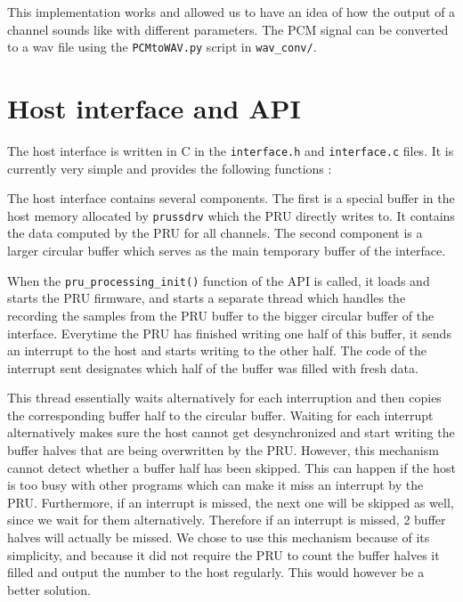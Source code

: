 \documentclass[]{report}
\begin{document}
This implementation works and allowed us to have an idea of how the output of a channel sounds like with different parameters. The PCM signal can be converted to a wav file using the \texttt{PCMtoWAV.py} script in \texttt{wav\_conv/}.

\hypertarget{host-interface-and-api}{%
\section{Host interface and API}\label{host-interface-and-api}}

The host interface is written in C in the \texttt{interface.h} and
\texttt{interface.c} files. It is currently very simple and provides the
following functions :




The host interface contains several components. The first is a special buffer in the host memory allocated by \texttt{prussdrv} which the PRU directly writes to. It contains the data computed by the PRU for all channels. The second component is a larger circular buffer which serves as the main temporary buffer of the interface.

When the \texttt{pru\_processing\_init()} function of the API is called, it loads and starts the PRU firmware, and starts a separate thread which handles the recording the samples from the PRU buffer to the bigger circular buffer of the interface. Everytime the PRU has finished writing one half of this buffer, it sends an interrupt to the host and starts writing to the other half. The code of the interrupt sent designates which half of the buffer was filled with fresh data.

This thread essentially waits alternatively for each interruption and then copies the corresponding buffer half to the circular buffer. Waiting for each interrupt alternatively makes sure the host cannot get desynchronized and start writing the buffer halves that are being overwritten by the PRU. However, this mechanism cannot detect whether a buffer half has been skipped. This can happen if the host is too busy with other programs which can make it miss an interrupt by the PRU. Furthermore, if an interrupt is missed, the next one will be skipped as well, since we wait for them alternatively. Therefore if an interrupt is missed, 2 buffer halves will actually be missed. We chose to use this mechanism because of its simplicity, and because it did not require the PRU to count the buffer halves it filled and output the number to the host regularly. This would however be a better solution.
\end{document}
